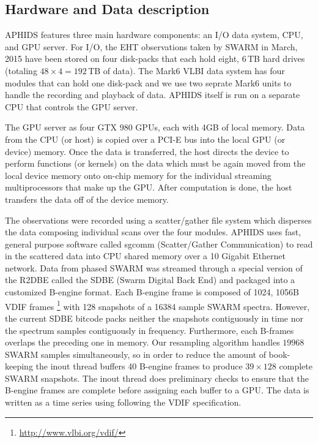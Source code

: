 \subsection{Hardware and Data description}

APHIDS features three main hardware components: an I/O data system, CPU, and GPU server.  For I/O, the 
EHT observations taken by SWARM in March, 2015 have been stored on four disk-packs that each hold eight, 
6\,TB hard drives (totaling $48 \times 4 = 192$\,TB of data).  The Mark6 VLBI data system has four modules that 
can hold one disk-pack and we use
two seprate Mark6 units to handle the recording and playback of data.  APHIDS itself is run on a separate CPU 
that controls the GPU server.

The GPU server as four GTX 980 GPUs, each with 4GB of local memory.  Data from the CPU (or host) is copied over 
a PCI-E bus into the local GPU (or device) memory.  Once the data is transferred, the host directs the device
to perform functions (or kernels) on the data which must be again moved from the local device memory onto 
on-chip memory for the individual streaming multiprocessors that make up the GPU.  After computation is done, 
the host transfers the data off of the device memory.

The observations were recorded using a scatter/gather file system which disperses the 
data composing individual scans over the four modules.  APHIDS uses fast, general purpose software called 
sgcomm (Scatter/Gather Communication) to read in 
the scattered data into CPU shared memory over a 10 Gigabit Ethernet network.  Data from phased SWARM was 
streamed through a special version of the R2DBE called the SDBE (Swarm Digital Back End) and packaged into
a customized B-engine format.  Each B-engine frame is composed of 1024, 1056B VDIF frames 
\footnote{\url{http://www.vlbi.org/vdif/}} with 128 snapshots of a 
16384 sample SWARM spectra.  However, the current SDBE bitcode packs
neither the snapshots contiguously in time nor the spectrum samples contiguously in frequency.  Furthermore, 
each B-frames overlaps the preceding one in memory.  Our resampling algorithm handles $19968$\,SWARM samples
simultaneously, so in order to reduce the amount of book-keeping the inout thread buffers 40 B-engine frames to 
produce $39 \times 128$ complete SWARM snapshots.  The inout thread does preliminary checks to ensure that the 
B-engine frames are complete before assigning each buffer to a GPU.  The data is written as a time series using 
following the VDIF specification.


